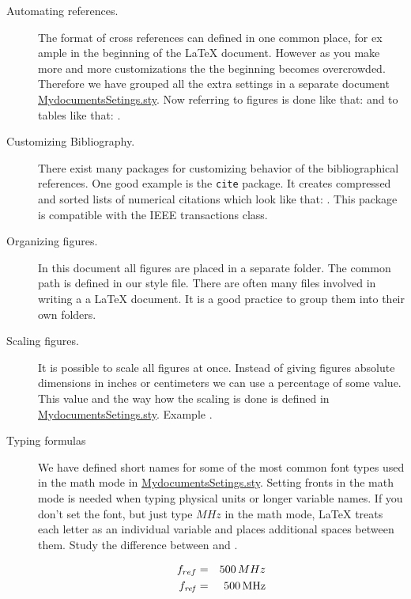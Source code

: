 \documentclass[a4paper]{article}
\begin{document}
\begin{description}
\item[Automating references.]
The format of cross references can defined in one common place, for ex ample in
the beginning of the \LaTeX{} document. However as you make more and more
customizations the the beginning becomes overcrowded. Therefore we have grouped
all the extra settings in a separate document
\href{http://www.electronics.oulu.fi/latex/examples/example_4/example_4_pkg.html}{MydocumentsSetings.sty}.
Now referring to figures is done like that:  and to
tables like that: .

\item[Customizing Bibliography.]
There exist many packages for customizing behavior of the bibliographical
references. One good example is the \verb|cite| package. It creates compressed
and sorted lists of numerical citations which look like that:
\cite{Book:Candy_1992,Book:Crawford_1994,Book:Golomb_82}. This package is
compatible with the IEEE transactions class.

\item[Organizing figures.]
In this document all figures are placed in a separate folder. The common path
is defined in our style file. There are often many files involved in writing a
a \LaTeX{} document. It is a good practice to group them into their own
folders.

\item[Scaling figures.]
It is possible to scale all figures at once. Instead of giving figures absolute
dimensions in inches or centimeters we can use a percentage of some value. This
value and the way how the scaling is done is defined in
\href{http://www.electronics.oulu.fi/latex/examples/example_4/example_4_pkg.html}{MydocumentsSetings.sty}.
Example .

\item[Typing formulas]
We have defined short names for some of the most common font types used in the
math mode in
\href{http://www.electronics.oulu.fi/latex/examples/example_4/example_4_pkg.html}{MydocumentsSetings.sty}.
Setting fronts in the math mode is needed when typing physical units or longer
variable names. If you don't set the font, but just type $MHz$ in the math
mode, \LaTeX{} treats each letter as an individual variable and places
additional spaces between them. Study the difference between
 and .

\begin{eqnarray}
f_{ref} &=& 500 \, MHz \label{eq:bad_typeetting}\\
f_{\mathit{ref}} &=& 500 \, \mathrm{MHz}\label{eq:good_typeetting}
\end{eqnarray}
\end{description}
\end{document}
